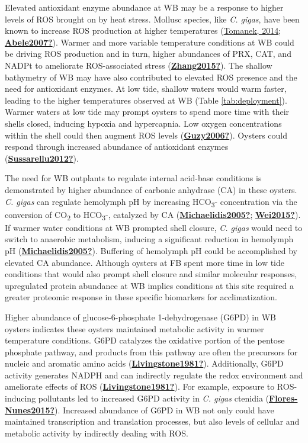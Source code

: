\documentclass [11pt, proquest] {uwthesis}[2015/03/03]
\begin{document}
Elevated antioxidant enzyme abundance at WB may be a response to higher levels of ROS brought on by heat stress. Mollusc species, like \emph{C. gigas}, have been known to increase ROS production at higher temperatures (\protect\hyperlink{ref-Tomanek2014}{Tomanek, 2014}; \protect\hyperlink{ref-Abele2007}{\textbf{Abele2007?}}). Warmer and more variable temperature conditions at WB could be driving ROS production and in turn, higher abundances of PRX, CAT, and NADPt to ameliorate ROS-associated stress (\protect\hyperlink{ref-Zhang2015}{\textbf{Zhang2015?}}). The shallow bathymetry of WB may have also contributed to elevated ROS presence and the need for antioxidant enzymes. At low tide, shallow waters would warm faster, leading to the higher temperatures observed at WB (Table \ref{tab:deployment}). Warmer waters at low tide may prompt oysters to spend more time with their shells closed, inducing hypoxia and hypercapnia. Low oxygen concentrations within the shell could then augment ROS levels (\protect\hyperlink{ref-Guzy2006}{\textbf{Guzy2006?}}). Oysters could respond through increased abundance of antioxidant enzymes (\protect\hyperlink{ref-Sussarellu2012}{\textbf{Sussarellu2012?}}).

The need for WB outplants to regulate internal acid-base conditions is demonstrated by higher abundance of carbonic anhydrase (CA) in these oysters. \emph{C. gigas} can regulate hemolymph pH by increasing HCO\textsubscript{3}- concentration via the conversion of CO\textsubscript{2} to HCO\textsubscript{3}-, catalyzed by CA (\protect\hyperlink{ref-Michaelidis2005}{\textbf{Michaelidis2005?}}; \protect\hyperlink{ref-Wei2015}{\textbf{Wei2015?}}). If warmer water conditions at WB prompted shell closure, \emph{C. gigas} would need to switch to anaerobic metabolism, inducing a significant reduction in hemolymph pH (\protect\hyperlink{ref-Michaelidis2005}{\textbf{Michaelidis2005?}}). Buffering of hemolymph pH could be accomplished by elevated CA abundance. Although oysters at FB spent more time in low tide conditions that would also prompt shell closure and similar molecular responses, upregulated protein abundance at WB implies conditions at this site required a greater proteomic response in these specific biomarkers for acclimatization.

Higher abundance of glucose-6-phosphate 1-dehydrogenase (G6PD) in WB oysters indicates these oysters maintained metabolic activity in warmer temperature conditions. G6PD catalyzes the oxidative portion of the pentose phosphate pathway, and products from this pathway are often the precursors for nucleic and aromatic amino acids (\protect\hyperlink{ref-Livingstone1981}{\textbf{Livingstone1981?}}). Additionally, G6PD activity generates NADPH and can indirectly regulate the redox environment and ameliorate effects of ROS (\protect\hyperlink{ref-Livingstone1981}{\textbf{Livingstone1981?}}). For example, exposure to ROS-inducing pollutants led to increased G6PD activity in \emph{C. gigas} ctenidia (\protect\hyperlink{ref-Flores-Nunes2015}{\textbf{Flores-Nunes2015?}}). Increased abundance of G6PD in WB not only could have maintained transcription and translation processes, but also levels of cellular and metabolic activity by indirectly dealing with ROS.
\end{document}
